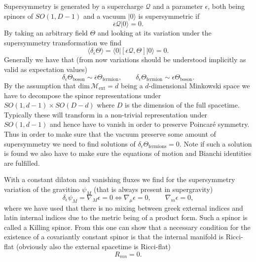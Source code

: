 Supersymmetry is generated by a supercharge $\mathcal{Q}$ and a parameter $\epsilon$, both being spinors of $SO(1,D-1)$ and a vacuum $|0\rangle$ is supersymmetric if 
\begin{equation}
    \overbar{\epsilon}\mathcal{Q}|0\rangle = 0.
\end{equation}
By taking an arbitrary field $\Theta$ and looking at its variation under the supersymmetry transformation we find 
\begin{equation}
    \langle \delta_{\epsilon}\Theta\rangle = \langle 0|\left[\overbar{\epsilon}\mathcal{Q},\Theta\right]|0\rangle = 0.
\end{equation}
Generally we have that (from now variations should be understood implicitly as valid as expectation values)
\begin{equation}
    \delta_\epsilon \Theta_{\text{boson}} \sim \overbar{\epsilon}\Theta_{\text{fermion}},\qquad \delta_\epsilon \Theta_{\text{fermion}}\sim \epsilon\Theta_{\text{boson}}.
\end{equation}
By the assumption that $\text{dim}\,\mathcal{M}{_{\text{ext}}}=d$ being a $d$-dimensional Minkowski space we have to decompose the spinor representations under $SO(1,d-1)\times SO(D-d)$ where $D$ is the dimension of the full spacetime. Typically these will transform in a non-trivial representation under $SO(1,d-1)$ and hence have to vanish in order to preserve Poincaré symmetry. Thus in order to make sure that the vacuum preserve some amount of supersymmetry we need to find solutions of $\delta_\epsilon\Theta_{\text{fermions}}=0$. Note if such a solution is found we also have to make sure the equations of motion and Bianchi identities are fulfilled.

With a constant dilaton and vanishing fluxes we find for the supersymmetry variation of the gravitino $\psi_M$ (that is always present in supergravity)
\begin{equation}
    \delta_\epsilon\psi_M = \nabla_M\epsilon = 0 \Leftrightarrow \nabla_\mu \epsilon = 0,\qquad \nabla_m\epsilon = 0,
\end{equation}
where we have used that there is no mixing between greek external indices and latin internal indices due to the metric being of a product form. Such a spinor is called a Killing spinor. From this one can show that a necessary condition for the existence of a covariantly constant spinor is that the internal manifold is Ricci-flat (obviously also the external spacetime is Ricci-flat)
\begin{equation}
    R_{mn} = 0.
\end{equation}


